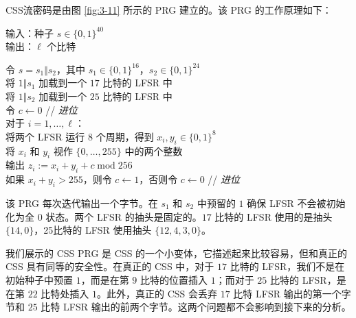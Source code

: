 \begin{snote}[CSS流密码。]
CSS流密码是由图 \ref{fig:3-11} 所示的 PRG 建立的。该 PRG 的工作原理如下：

\vspace*{5pt}

\hspace*{5pt} 输入：种子 $s\in\{0,1\}^{40}$\\
\hspace*{26pt} 输出：$\ell$ 个比特

\vspace{3pt}

\hspace*{5pt} 令 $s=s_1 \Vert s_2$，其中 $s_1\in\{0,1\}^{16}$，$s_2\in\{0,1\}^{24}$\\
\hspace*{26pt} 将 $1\Vert s_1$ 加载到一个 $17$ 比特的 LFSR 中\\
\hspace*{26pt} 将 $1\Vert s_2$ 加载到一个 $25$ 比特的 LFSR 中\\
\hspace*{26pt} 令 $c\leftarrow 0$ \quad\quad // \emph{进位}\\
\hspace*{26pt} 对于 $i=1,\dots,\ell$：\\
\hspace*{50pt} 将两个 LFSR 运行 $8$ 个周期，得到 $x_i,y_i\in\{0,1\}^8$\\
\hspace*{50pt} 将 $x_i$ 和 $y_i$ 视作 $\{0,\dots,255\}$ 中的两个整数\\
\hspace*{50pt} 输出 $z_i:=x_i+y_i+c\;\mathrm{mod}\;256$\\
\hspace*{50pt} 如果 $x_i+y_i>255$，则令 $c\leftarrow1$，否则令 $c\leftarrow0$ \quad\quad // \emph{进位}

\vspace*{5pt}

该 PRG 每次迭代输出一个字节。在 $s_1$ 和 $s_2$ 中预留的 $1$ 确保 LFSR 不会被初始化为全 $0$ 状态。两个 LFSR 的抽头是固定的。$17$ 比特的 LFSR 使用的是抽头 $\{14,0\}$，25比特的 LFSR 使用抽头 $\{12,4,3,0\}$。

我们展示的 CSS PRG 是 CSS 的一个小变体，它描述起来比较容易，但和真正的 CSS 具有同等的安全性。在真正的 CSS 中，对于 $17$ 比特的 LFSR，我们不是在初始种子中预置 $1$，而是在第 $9$ 比特的位置插入 $1$；而对于 $25$ 比特的 LFSR，是在第 $22$ 比特处插入 $1$。此外，真正的 CSS 会丢弃 $17$ 比特 LFSR 输出的第一个字节和 $25$ 比特 LFSR 输出的前两个字节。这两个问题都不会影响到接下来的分析。
\end{snote}

